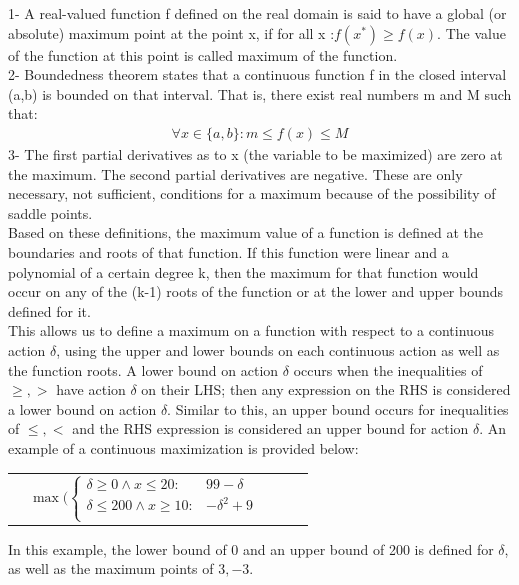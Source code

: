 \documentclass[letterpaper]{article}
\renewcommand{\-}{\text{-}}
\begin{document}
1- A real-valued function f defined on the real domain is said to have a global (or absolute) maximum point at the point x, if for all x :$ f(x^{*}) \geq f(x) $. The value of the function at this point is called maximum of the function.\\
2- Boundedness theorem states that a continuous function f in the closed interval (a,b) is bounded on that interval. That is, there exist real numbers m and M such that:
\begin{align*}
\forall x \in \{a,b\} : m \leq f(x) \leq M 
\end{align*}
3- The first partial derivatives as to x (the variable to be maximized) are zero at the maximum. The second partial derivatives are negative. These are only necessary, not sufficient, conditions for a maximum because of the possibility of saddle points.\\
Based on these definitions, the maximum value of a function is defined at the boundaries and roots of that function. If this function were linear and a polynomial of a certain degree k, then the maximum for that function would occur on any of the (k-1) roots of the function or at the lower and upper bounds defined for it. 
\\This allows us to define a maximum on a function with respect to a continuous action $\delta$, using the upper and lower bounds on each continuous action as well as the function roots. A lower bound on action $\delta$ occurs when the inequalities of $\geq ,>$ have action $\delta$ on their LHS; then any expression on the RHS is considered a lower bound on action $\delta$. Similar to this, an upper bound occurs for inequalities of $\leq , <$ and the RHS expression is considered an upper bound for action $\delta$. An example of a continuous maximization is provided below:

\vspace{-5mm}

{\footnotesize
\begin{center}
\begin{tabular}{r c c c l}
&
\hspace{-9mm} $\max \Bigg(
  \begin{cases}
\delta  \geq 0 \wedge x \leq 20: & 99-\delta \\ 
\delta \leq 200 \wedge x \geq 10: & - \delta^{2} +9 \\ 
  \end{cases}$
\end{tabular}
\end{center}
}
In this example, the lower bound of 0 and an upper bound of 200 is defined for $\delta$, as well as the maximum points of ${3,-3}$. 
\end{document}
